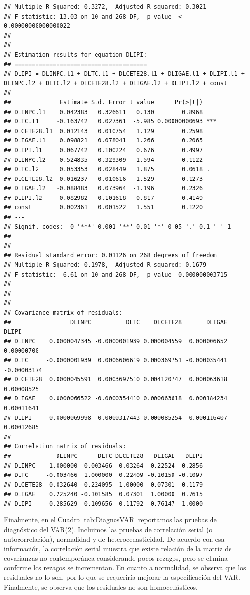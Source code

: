 \documentclass[
]{book}
\begin{document}
\begin{verbatim}
## Multiple R-Squared: 0.3272,  Adjusted R-squared: 0.3021 
## F-statistic: 13.03 on 10 and 268 DF,  p-value: < 0.00000000000000022 
## 
## 
## Estimation results for equation DLIPI: 
## ====================================== 
## DLIPI = DLINPC.l1 + DLTC.l1 + DLCETE28.l1 + DLIGAE.l1 + DLIPI.l1 + DLINPC.l2 + DLTC.l2 + DLCETE28.l2 + DLIGAE.l2 + DLIPI.l2 + const 
## 
##              Estimate Std. Error t value      Pr(>|t|)    
## DLINPC.l1    0.042383   0.326611   0.130        0.8968    
## DLTC.l1     -0.163742   0.027361  -5.985 0.00000000693 ***
## DLCETE28.l1  0.012143   0.010754   1.129        0.2598    
## DLIGAE.l1    0.098821   0.078041   1.266        0.2065    
## DLIPI.l1     0.067742   0.100224   0.676        0.4997    
## DLINPC.l2   -0.524835   0.329309  -1.594        0.1122    
## DLTC.l2      0.053353   0.028449   1.875        0.0618 .  
## DLCETE28.l2 -0.016237   0.010616  -1.529        0.1273    
## DLIGAE.l2   -0.088483   0.073964  -1.196        0.2326    
## DLIPI.l2    -0.082982   0.101618  -0.817        0.4149    
## const        0.002361   0.001522   1.551        0.1220    
## ---
## Signif. codes:  0 '***' 0.001 '**' 0.01 '*' 0.05 '.' 0.1 ' ' 1
## 
## 
## Residual standard error: 0.01126 on 268 degrees of freedom
## Multiple R-Squared: 0.1978,  Adjusted R-squared: 0.1679 
## F-statistic:  6.61 on 10 and 268 DF,  p-value: 0.000000003715 
## 
## 
## 
## Covariance matrix of residuals:
##                 DLINPC          DLTC    DLCETE28       DLIGAE       DLIPI
## DLINPC    0.0000047345 -0.0000001939 0.000004559  0.000006652  0.00000700
## DLTC     -0.0000001939  0.0006606619 0.000369751 -0.000035441 -0.00003174
## DLCETE28  0.0000045591  0.0003697510 0.004120747  0.000063618  0.00008525
## DLIGAE    0.0000066522 -0.0000354410 0.000063618  0.000184234  0.00011641
## DLIPI     0.0000069998 -0.0000317443 0.000085254  0.000116407  0.00012685
## 
## Correlation matrix of residuals:
##             DLINPC      DLTC DLCETE28   DLIGAE   DLIPI
## DLINPC    1.000000 -0.003466  0.03264  0.22524  0.2856
## DLTC     -0.003466  1.000000  0.22409 -0.10159 -0.1097
## DLCETE28  0.032640  0.224095  1.00000  0.07301  0.1179
## DLIGAE    0.225240 -0.101585  0.07301  1.00000  0.7615
## DLIPI     0.285629 -0.109656  0.11792  0.76147  1.0000
\end{verbatim}

Finalmente, en el Cuadro \ref{tab:DiagnosVAR} reportamos las pruebas de diagnóstico del VAR(2). Incluimos las pruebas de correlación serial (o autocorrelación), normalidad y de heterocedasticidad. De acuerdo con esa información, la correlación serial muestra que existe relación de la matriz de covarianzas no contemporánea considerando pocos rezagos, pero se elimina conforme los rezagos se incrementan. En cuanto a normalidad, se observa que los residuales no lo son, por lo que se requeriría mejorar la especificación del VAR. Finalmente, se observa que los residuales no son homocedásticos.
\end{document}
